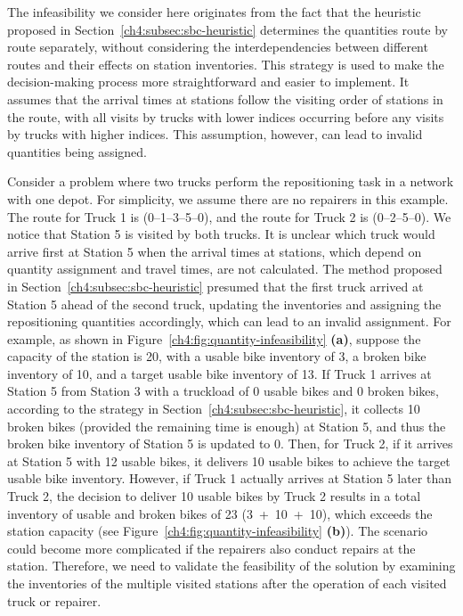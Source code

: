 The infeasibility we consider here originates from the fact that the heuristic proposed in
Section~\ref{ch4:subsec:sbc-heuristic} determines the quantities route by route separately, without considering the interdependencies
between different routes and their effects on station inventories. This strategy is used to make the
decision-making process more straightforward and easier to implement. It assumes that the arrival
times at stations follow the visiting order of stations in the route, with all visits by trucks with
lower indices occurring before any visits by trucks with higher indices. This assumption, however,
can lead to invalid quantities being assigned.

Consider a problem where two trucks perform the repositioning task in a network with one depot. For
simplicity, we assume there are no repairers in this example. The route for Truck 1 is
(0--1--3--5--0), and the route for Truck 2 is (0--2--5--0). We notice that Station 5 is visited by
both trucks. It is unclear which truck would arrive first at Station 5 when the arrival times at
stations, which depend on quantity assignment and travel times, are not calculated. The method
proposed in Section~\ref{ch4:subsec:sbc-heuristic} presumed that the first truck arrived at Station 5 ahead of the second
truck, updating the inventories and assigning the repositioning quantities accordingly, which can
lead to an invalid assignment. For example, as shown in Figure~\ref{ch4:fig:quantity-infeasibility} \textbf{(a)}, suppose the capacity
of the station is 20, with a usable bike inventory of 3, a broken bike inventory of 10, and a target
usable bike inventory of 13. If Truck 1 arrives at Station 5 from Station 3 with a truckload of 0
usable bikes and 0 broken bikes, according to the strategy in Section~\ref{ch4:subsec:sbc-heuristic}, it collects 10 broken
bikes (provided the remaining time is enough) at Station 5, and thus the broken bike inventory of
Station 5 is updated to 0. Then, for Truck 2, if it arrives at Station 5 with 12 usable bikes, it
delivers 10 usable bikes to achieve the target usable bike inventory. However, if Truck 1 actually
arrives at Station 5 later than Truck 2, the decision to deliver 10 usable bikes by Truck 2 results
in a total inventory of usable and broken bikes of 23 (3~+~10~+~10), which exceeds the station
capacity (see Figure~\ref{ch4:fig:quantity-infeasibility} \textbf{(b)}). The scenario could become more complicated if the repairers
also conduct repairs at the station. Therefore, we need to validate the feasibility of the solution
by examining the inventories of the multiple visited stations after the operation of each visited
truck or repairer.

